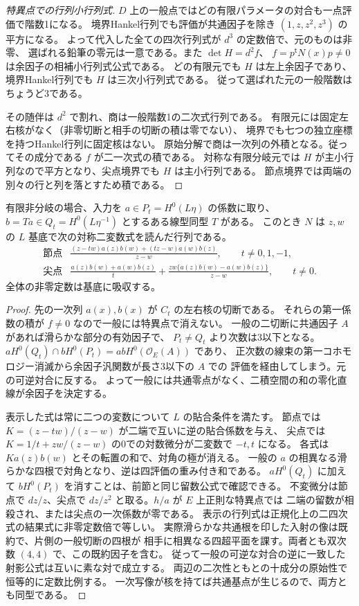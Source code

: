 \begin{proof}[特異点での行列小行列式]
$D$ 上の一般点ではどの有限パラメータの対合も一点評価で階数1になる。
境界Hankel行列でも評価が共通因子を除き $(1,z,z^2,z^3)$ の平方になる。
よって代入した全ての四次行列式が $d^3$ の定数倍で、元のものは非零、
選ばれる鉛筆の零元は一意である。また $\det H=d^2 f$、
$f=p^{\mathsf t}N(x)p\ne0$ は余因子の相補小行列式公式である。
どの有限元でも $H$ は左上余因子であり、境界Hankel行列でも $H$ は三次小行列式である。
従って選ばれた元の一般階数はちょうど3である。

その随伴は $d^2$ で割れ、商は一般階数1の二次式行列である。
有限元には固定左右核がなく（非零切断と相手の切断の積は零でない）、
境界でも七つの独立座標を持つHankel行列に固定核はない。
原始分解で商は一次列の外積となる。従ってその成分である $f$ が二一次式の積である。
対称な有限分岐元では $H$ が主小行列なので平方となり、尖点境界でも $H$ は主小行列である。
節点境界では両端の別々の行と列を落とすため積である。
\end{proof}

\begin{proposition}\label{prop:singular-elliptic-binary-bezout}
有限非分岐の場合、入力を $a\in P_t=H^0(L\eta)$ の係数に取り、
$b=Ta\in Q_t=H^0(L\eta^{-1})$ とするある線型同型 $T$ がある。
このとき $N$ は $z,w$ の $L$ 基底で次の対称二変数式を読んだ行列である。
\[
\begin{array}{ll}
\text{節点}&
\displaystyle\frac{(z-tw)a(z)b(w)+(tz-w)a(w)b(z)}{z-w},\qquad t\ne 0,1,-1,\\[6pt]
\text{尖点}&
\displaystyle\frac{a(z)b(w)+a(w)b(z)}{t}
   +\frac{zw\{a(z)b(w)-a(w)b(z)\}}{z-w},\qquad t\ne0 .
\end{array}
\]
全体の非零定数は基底に吸収する。
\end{proposition}
\begin{proof}
先の一次列 $a(x),b(x)$ が $C_t$ の左右核の切断である。
それらの第一係数の積が $f\ne0$ なので一般には特異点で消えない。
一般の二切断に共通因子 $A$ があれば滑らかな部分の有効因子で、
$P_t\ne Q_t$ より次数は3以下となる。
$aH^0(Q_t)\cap bH^0(P_t)=abH^0(\mathcal O_E(A))$ であり、
正次数の線束の第一コホモロジー消滅から余因子汎関数が長さ3以下の $A$ での
評価を経由してしまう。元の可逆対合に反する。
よって一般には共通零点がなく、二積空間の和の零化直線が余因子を決定する。

表示した式は常に二つの変数について $L$ の貼合条件を満たす。
節点では $K=(z-tw)/(z-w)$ が二端で互いに逆の貼合係数を与え、
尖点では $K=1/t+zw/(z-w)$ の0での対数微分が二変数で $-t,t$ になる。
各式は $K a(z)b(w)$ とその転置の和で、対角の極が消える。
一般の $a$ の相異なる滑らかな四根で対角となり、逆は四評価の重み付き和である。
$aH^0(Q_t)$ に加えて $bH^0(P_t)$ を消すことは、前節と同じ留数公式で確認できる。
不変微分は節点で $dz/z$、尖点で $dz/z^2$ と取る。$h/a$ が $E$ 上正則な特異点では
二端の留数が相殺され、または尖点の一次係数が零である。
表示の行列式は正規化上の二四次式の結果式に非零定数倍で等しい。
実際滑らかな共通根を印した入射の像は既約で、片側の一般切断の四根が
相手に相異なる四超平面を課す。両者とも双次数 $(4,4)$ で、この既約因子を含む。
従って一般の可逆な対合の逆に一致した射影公式は互いに素な対で成立する。
両辺の二次性ともとの十成分の原始性で恒等的に定数比例する。
一次写像が核を持てば共通基点が生じるので、両方とも同型である。
\end{proof}

